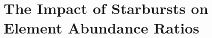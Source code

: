 \documentclass[main.tex]{subfiles}
\begin{document}
\chapter{The Impact of Starbursts on Element Abundance Ratios}
\label{bursts}








\end{document}
